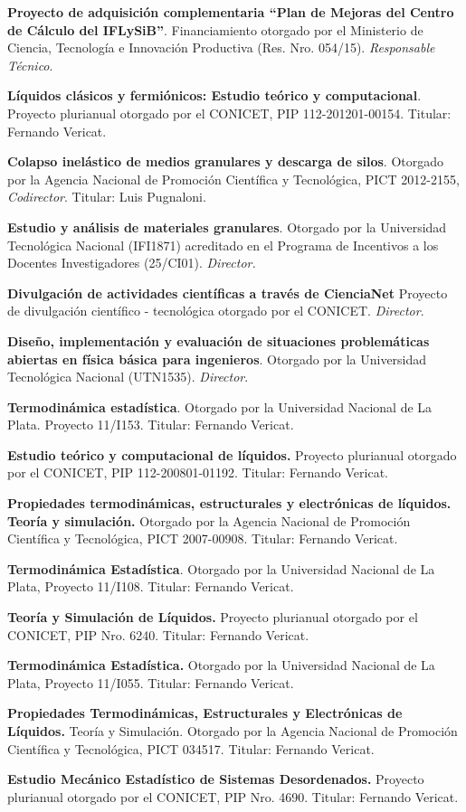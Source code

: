  \textbf{Proyecto de adquisición complementaria ``Plan de Mejoras del Centro de Cálculo del IFLySiB''}. Financiamiento otorgado por el Ministerio de Ciencia, Tecnología e Innovación Productiva (Res. Nro. 054/15). \textit{Responsable Técnico}.

  \textbf{Líquidos clásicos y fermiónicos: Estudio teórico y computacional}. Proyecto plurianual otorgado por el CONICET, PIP 112-201201-00154. Titular: Fernando Vericat.

 \textbf{Colapso inelástico de medios granulares y descarga de silos}. Otorgado por la Agencia Nacional de Promoción Científica y Tecnológica, PICT 2012-2155, \textit{Codirector}. Titular: Luis Pugnaloni.

 \textbf{Estudio y análisis de materiales granulares}. Otorgado por la Universidad Tecnológica Nacional (IFI1871) acreditado en el Programa de Incentivos a los Docentes Investigadores (25/CI01). \textit{Director.}

 \textbf{Divulgación de actividades científicas a través de CienciaNet} Proyecto de divulgación científico - tecnológica otorgado por el CONICET. \textit{Director}.

 \textbf{Diseño, implementación y evaluación de situaciones problemáticas abiertas en física básica para ingenieros}. Otorgado por la Universidad Tecnológica Nacional (UTN1535). \textit{Director}.

 \textbf{Termodinámica estadística}. Otorgado por la Universidad Nacional de La Plata. Proyecto 11/I153. Titular: Fernando Vericat. 

 \textbf{Estudio teórico y computacional de líquidos.} Proyecto plurianual otorgado por el CONICET, PIP  112-200801-01192. Titular: Fernando Vericat.

 \textbf{Propiedades termodinámicas, estructurales y electrónicas de líquidos. Teoría y simulación.} Otorgado por la Agencia Nacional de Promoción Científica y Tecnológica, PICT 2007-00908. Titular: Fernando Vericat.

 \textbf{Termodinámica Estadística}. Otorgado por la Universidad Nacional de La Plata, Proyecto 11/I108. Titular: Fernando Vericat.

 \textbf{Teoría y Simulación de Líquidos.} Proyecto plurianual otorgado por el CONICET, PIP Nro. 6240. Titular: Fernando Vericat.

 \textbf{Termodinámica Estadística.} Otorgado por la Universidad Nacional de La Plata, Proyecto 11/I055. Titular: Fernando Vericat.

 \textbf{Propiedades Termodinámicas, Estructurales y Electrónicas de Líquidos.} Teoría y Simulación. Otorgado por la Agencia Nacional de Promoción Científica y Tecnológica, PICT 034517. Titular: Fernando Vericat.

 \textbf{Estudio Mecánico Estadístico de Sistemas Desordenados.} Proyecto plurianual otorgado por el CONICET, PIP Nro. 4690. Titular: Fernando Vericat.
